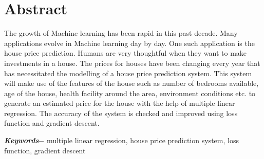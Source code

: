 





\KECcoverpage %
\KECtitlepage %




\chapter*{Abstract} %
The growth of Machine learning has been rapid in this past decade. Many applications evolve in Machine learning day by day. One such application is the house price prediction. Humans are very thoughtful when they want to make investments in a house. The prices for houses have been changing every year that has necessitated the modelling of a house price prediction system. This system will make use of the features of the house such as number of bedrooms available, age of the house, health facility around the area, environment conditions etc. to generate an estimated price for the house with the help of multiple linear regression. The accuracy of the system is checked and improved using loss function and gradient descent.
\par
\textbf{\textit{Keywords$-$}} multiple linear regression, house price prediction system, loss function, gradient descent 


